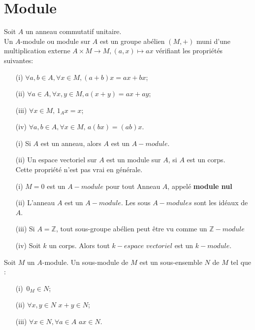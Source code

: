 \section{Module}
\begin{madefinition}
	Soit $A$ un anneau commutatif unitaire.\\
	Un $A$-module ou module sur $A$ est un groupe abélien $(M,+)$ muni d'une multiplication externe $A \times M \rightarrow M, (a,x) \mapsto ax$ vérifiant les propriétés suivantes:
	\begin{enumerate}
		\item[(i)]$ \forall a, b \in A, \forall x \in M,(a+b)x = ax+bx$;
		\item[(ii)] $ \forall a \in A, \forall x, y \in M,a(x+y) = ax+ay$;
		\item[(iii)] $ \forall x \in M, \,1_A x = x$;
		\item[(iv)] $\forall a, b \in A, \forall x \in M, \, a(bx)=(ab)x$.
	\end{enumerate}
\end{madefinition}
\begin{maremarque}
	\begin{enumerate}
		\item[(i)] Si $A$ est un anneau, alors $A$ est un $A-module$.
		\item[(ii)] Un espace vectoriel sur $A$ est un module sur $A$, si $A$ est un corps.
		\\ Cette propriété n'est pas vrai en générale.
	\end{enumerate}
\end{maremarque}
\begin{monexemple}
	\begin{enumerate}
		\item[(i)] $M= {0} $ est un $A-module$ pour tout Anneau $A$, appelé \textbf{module nul}
		\item[(ii)] L'anneau $A$ est un $A-module$. Les sous $A-modules$ sont les idéaux de $A$.
		\item[(iii)] Si $A= \mathbb{Z}$, tout sous-groupe abélien peut être vu comme un $\mathbb{Z}-module$
		\item[(iv)] Soit $k$ un corps.  Alors tout $k-espace$ $vectoriel$ est un $k-module$. 
	\end{enumerate}
\end{monexemple}
\begin{madefinition}
	Soit $M$ un $A$-module. Un sous-module de $M$ est un sous-ensemble $N$ de $M$ tel que :
	\begin{enumerate}
		\item[(i)]$ \, 0_M \in N$;
		\item[(ii)]$ \forall x, y \in N \, \, x+y \in N$;
		\item[(iii)] $\forall x \in N, \forall a \in A \, \, ax \in N$.
	\end{enumerate}
\end{madefinition}

